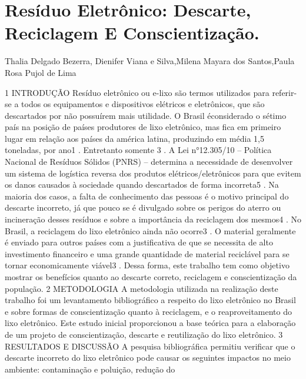 


\section*{Resíduo Eletrônico: Descarte, Reciclagem E Conscientização.}

Thalia Delgado Bezerra, Dienifer Viana e Silva,Milena Mayara dos Santos,Paula Rosa Pujol de Lima

1 INTRODUÇÃO
Resíduo eletrônico ou e-lixo são termos utilizados para referir-se a todos os equipamentos
e dispositivos elétricos e eletrônicos, que são descartados por não possuírem mais utilidade. O
Brasil éconsiderado o sétimo país na posição de países produtores de lixo eletrônico, mas fica 
em primeiro lugar em relação aos países da américa latina, produzindo em média 1,5 toneladas, 
por ano1
. Entretanto somente 3%
.
A Lei n°12.305/10 – Política Nacional de Resíduos Sólidos (PNRS) – determina a
necessidade de desenvolver um sistema de logística reversa dos produtos elétricos/eletrônicos
para que evitem os danos causados à sociedade quando descartados de forma incorreta5
. Na
maioria dos casos, a falta de conhecimento das pessoas é o motivo principal do descarte incorreto,
já que pouco se é divulgado sobre os perigos do aterro ou incineração desses resíduos e sobre a
importância da reciclagem dos mesmos4
.
No Brasil, a reciclagem do lixo eletrônico ainda não ocorre3
. O material geralmente é
enviado para outros países com a justificativa de que se necessita de alto investimento financeiro
e uma grande quantidade de material reciclável para se tornar economicamente viável3
. Dessa
forma, este trabalho tem como objetivo mostrar os benefícios quanto ao descarte correto,
reciclagem e conscientização da população.
2 METODOLOGIA
A metodologia utilizada na realização deste trabalho foi um levantamento bibliográfico a
respeito do lixo eletrônico no Brasil e sobre formas de conscientização quanto à reciclagem, e o
reaproveitamento do lixo eletrônico. Este estudo inicial proporcionou a base teórica para a
elaboração de um projeto de conscientização, descarte e reutilização do lixo eletrônico.
3 RESULTADOS E DISCUSSÃO
A pesquisa bibliográfica permitiu verificar que o descarte incorreto do lixo eletrônico 
pode causar os seguintes impactos no meio ambiente: contaminação e poluição, redução do
